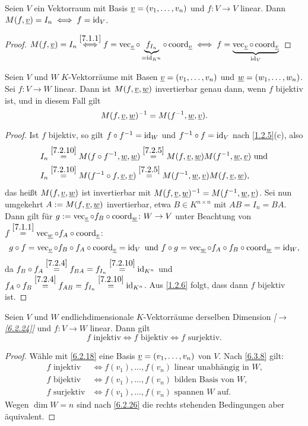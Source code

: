 \documentclass[../../main.tex]{subfiles}
\begin{document}
\begin{pro}\label{7.2.10}
Seien $V$ ein Vektorraum mit Basis ${\underline v}=(v_1,\dots,v_n)$ und $f\colon V\to V$ linear. Dann $M(f,{\underline v})=I_n\iff f=\operatorname{id}_V$.
\end{pro}

\begin{proof}
$M(f,{\underline v})=I_n\overset{\ref{7.1.1}}\iff f=\operatorname{vec}_{\underline v}\circ\underbrace{f_{I_n}}_{=\operatorname{id}_{K^n}}\circ\operatorname{coord}_{\underline v}
\iff f=\underbrace{\operatorname{vec}_{\underline v}\circ\operatorname{coord}_{\underline v}}_{\operatorname{id}_V}
$
\end{proof}

\begin{pro}\label{7.2.11}
Seien $V$ und $W$ $K$-Vektorräume mit Basen ${\underline v}=(v_1,\dots,v_n)$ und ${\underline w}=(w_1,\dots,w_n)$. Sei $f\colon V\to W$ linear. Dann ist $M(f,{\underline v},{\underline w})$ invertierbar genau dann,
wenn $f$ bijektiv ist, und in diesem Fall gilt \[M(f,{\underline v},{\underline w})^{-1}=M(f^{-1},{\underline w},{\underline v}).\]
\end{pro}

\begin{proof}
Ist $f$ bijektiv, so gilt $f\circ f^{-1}=\operatorname{id}_W$ und $f^{-1}\circ f=\operatorname{id}_V$ nach \ref{1.2.5}(c), also
\begin{align*}
I_n&\overset{\ref{7.2.10}}=M(f\circ f^{-1},{\underline w},{\underline w})\overset{\ref{7.2.5}}=M(f,{\underline v},{\underline w}) M(f^{-1},{\underline w},{\underline v})\text{ und}\\
I_n&\overset{\ref{7.2.10}}=M(f^{-1}\circ f,{\underline v},{\underline v})\overset{\ref{7.2.5}}=M(f^{-1},{\underline w},{\underline v}) M(f,{\underline v},{\underline w}),
\end{align*}
das heißt $M(f,{\underline v},{\underline w})$ ist invertierbar mit $M(f,{\underline v},{\underline w})^{-1}=M(f^{-1},{\underline w},{\underline v})$.
Sei nun umgekehrt $A:=M(f,{\underline v},{\underline w})$ invertierbar, etwa $B\in K^{n\times n}$ mit $AB=I_n=BA$. Dann gilt für $g:=\operatorname{vec}_{\underline v}\circ f_B\circ\operatorname{coord}_{\underline w}\colon W\to V$ unter Beachtung von
$f\overset{\ref{7.1.1}}=\operatorname{vec}_{\underline w}\circ f_A\circ\operatorname{coord}_{\underline v}$:
\[
g\circ f=\operatorname{vec}_{\underline v}\circ f_B\circ f_A\circ\operatorname{coord}_{\underline v}=\operatorname{id}_V\text{ und }
f\circ g=\operatorname{vec}_{\underline w}\circ f_A\circ f_B\circ\operatorname{coord}_{\underline w}=\operatorname{id}_W,
\]
da $f_B\circ f_A\overset{\ref{7.2.4}}=f_{BA}=f_{I_n}\overset{\ref{7.2.10}}=\operatorname{id}_{K^n}$ und $f_A\circ f_B\overset{\ref{7.2.4}}=f_{AB}=f_{I_n}\overset{\ref{7.2.10}}=\operatorname{id}_{K^n}$. Aus \ref{1.2.6} folgt, dass dann $f$ bijektiv ist.
\end{proof}

\begin{pro}\label{7.2.12}
Seien $V$ und $W$ endlichdimensionale $K$-Vektorräume derselben Dimension \emph{[$\to$\ref{6.2.24}]} und $f\colon V\to W$ linear. Dann gilt
\[\text{$f$ injektiv}\iff\text{$f$ bijektiv}\iff\text{$f$ surjektiv.}\]
\end{pro}

\begin{proof}
Wähle mit \ref{6.2.18} eine Basis ${\underline v}=(v_1,\dots,v_n)$ von $V$. Nach \ref{6.3.8} gilt:
\begin{align*}
\text{$f$ injektiv}&\iff\text{$f(v_1),\dots,f(v_n)$ linear unabhängig in $W$,}\\
\text{$f$ bijektiv}&\iff\text{$f(v_1),\dots,f(v_n)$ bilden Basis von $W$,}\\
\text{$f$ surjektiv}&\iff\text{$f(v_1),\dots,f(v_n)$ spannen $W$ auf.}
\end{align*}
Wegen $\dim W=n$ sind nach \ref{6.2.26} die rechts stehenden Bedingungen aber äquivalent.
\end{proof}
\end{document}
